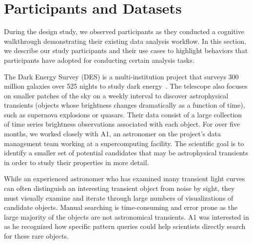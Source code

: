 \section{Participants and Datasets}
During the design study, we observed participants as they conducted a cognitive walkthrough demonstrating their existing data analysis workflow. In this section, we describe our study participants and their use cases to highlight behaviors that participants have adopted for conducting certain analysis tasks.
\par\noindent{} The Dark Energy Survey (DES) is a multi-institution project that surveys 300 million galaxies over 525 nights to study dark energy~\cite{Drlica-Wagner2017}. The telescope also focuses on smaller patches of the sky on a weekly interval to discover astrophysical transients (objects whose brightness changes dramatically as a function of time), such as supernova explosions or quasars. Their data consist of a large collection of time series brightness observations associated with each object. For over five months, we worked closely with A1, an astronomer on the project's data management team working at a supercomputing facility. The scientific goal is to identify a smaller set of potential candidates that may be astrophysical transients in order to study their properties in more detail. 
\par While an experienced astronomer who has examined many transient light curves can often distinguish an interesting transient object from noise by sight, they must visually examine and iterate through large numbers of visualizations of candidate objects. Manual searching is time-consuming and error prone as the large majority of the objects are not astronomical transients. A1 was interested in \zv as he recognized how specific pattern queries could help scientists directly search for these rare objects. 
